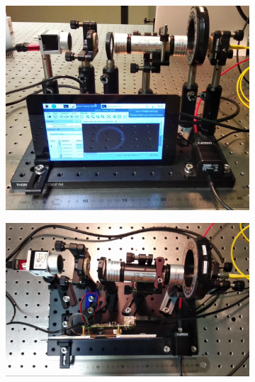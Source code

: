 \documentclass[11pt, a4paper, twoside]{article} %
\begin{document}
\begin{figure}[h!] 
     \centering 
    \begin{subfigure}[b]{0.42\linewidth}
    \includegraphics[width=\linewidth]{demo1.jpg}
     \end{subfigure}
 \begin{subfigure}[b]{0.43\linewidth}
     \includegraphics[width=\linewidth]{demo3.jpg}
     \end{subfigure}
 \begin{subfigure}[b]{0.32\linewidth}

\end{subfigure}
\end{figure}
\end{document}

